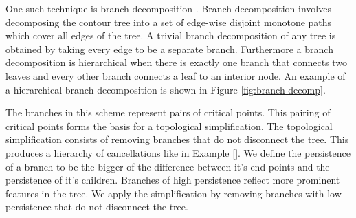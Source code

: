 
One such technique is branch decomposition \cite{ct-branch-decomp}. Branch decomposition involves decomposing the contour tree into a set of edge-wise disjoint monotone paths which cover all edges of the tree. A trivial branch decomposition of any tree is obtained by taking every edge to be a separate branch. Furthermore a branch decomposition is hierarchical when there is exactly one branch that connects two leaves and every other branch connects a leaf to an interior node. An example of a hierarchical branch decomposition is shown in Figure \ref{fig:branch-decomp}.

The branches in this scheme represent pairs of critical points. This pairing of critical points forms the basis for a topological simplification. The topological simplification consists of removing branches that do not disconnect the tree. This produces a hierarchy of cancellations like in Example []. We define the persistence of a branch to be the bigger of the difference between it's end points and the persistence of it's children. Branches of high persistence reflect more prominent features in the tree. We apply the simplification by removing branches with low persistence that do not disconnect the tree.

